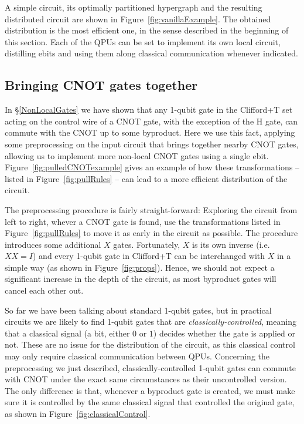 



A simple circuit, its optimally partitioned hypergraph and the resulting distributed circuit are shown in Figure~\ref{fig:vanillaExample}. The obtained distribution is the most efficient one, in the sense described in the beginning of this section. Each of the QPUs can be set to implement its own local circuit, distilling ebits and using them along classical communication whenever indicated.


\subsection{Bringing CNOT gates together}
\label{pullCNOTs}

In \S\ref{NonLocalGates} we have shown that any 1-qubit gate in the Clifford+T set acting on the control wire of a CNOT gate, with the exception of the H gate, can commute with the CNOT up to some byproduct. Here we use this fact, applying some preprocessing on the input circuit that brings together nearby CNOT gates, allowing us to implement more non-local CNOT gates using a single ebit. Figure~\ref{fig:pulledCNOTexample} gives an example of how these transformations -- listed in Figure~\ref{fig:pullRules} -- can lead to a more efficient distribution of the circuit.



The preprocessing procedure is fairly straight-forward: Exploring the circuit from left to right, whever a CNOT gate is found, use the transformations listed in Figure~\ref{fig:pullRules} to move it as early in the circuit as possible. The procedure introduces some additional \(X\) gates. Fortunately, \(X\) is its own inverse (i.e.\ \(XX = I\)) and every 1-qubit gate in Clifford+T can be interchanged with \(X\) in a simple way (as shown in Figure~\ref{fig:props}). Hence, we should not expect a significant increase in the depth of the circuit, as most byproduct gates will cancel each other out.

So far we have been talking about standard 1-qubit gates, but in practical circuits we are likely to find 1-qubit gates that are \textit{classically-controlled}, meaning that a classical signal (a bit, either \(0\) or \(1\)) decides whether the gate is applied or not. These are no issue for the distribution of the circuit, as this classical control may only require classical communication between QPUs. Concerning the preprocessing we just described, classically-controlled 1-qubit gates can commute with CNOT under the exact same circumstances as their uncontrolled version. The only difference is that, whenever a byproduct gate is created, we must make sure it is controlled by the same classical signal that controlled the original gate, as shown in Figure~\ref{fig:classicalControl}.

